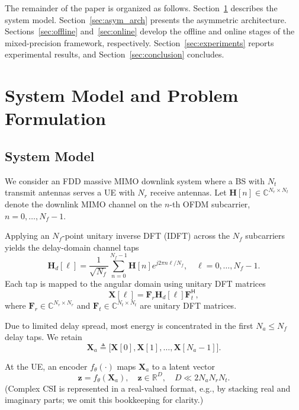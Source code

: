 \documentclass[conference]{IEEEtran}
\begin{document}
\noindent
The remainder of the paper is organized as follows. Section~\ref{sec:system_model} describes the system model. Section~\ref{sec:asym_arch} presents the asymmetric architecture. Sections~\ref{sec:offline} and~\ref{sec:online} develop the offline and online stages of the mixed-precision framework, respectively. Section~\ref{sec:experiments} reports experimental results, and Section~\ref{sec:conclusion} concludes.

\section{System Model and Problem Formulation}
\label{sec:system_model}

\subsection{System Model}
\label{subsec:system_model}
We consider an FDD massive MIMO downlink system where a BS with $N_t$ transmit antennas serves a UE with $N_r$ receive antennas. Let $\mathbf{H}[n] \in \mathbb{C}^{N_r \times N_t}$ denote the downlink MIMO channel on the $n$-th OFDM subcarrier, $n=0,\ldots,N_f-1$.

Applying an $N_f$-point unitary inverse DFT (IDFT) across the $N_f$ subcarriers yields the delay-domain channel taps
\begin{equation}
\mathbf{H}_d[\ell]
= \frac{1}{\sqrt{N_f}} \sum_{n=0}^{N_f-1} \mathbf{H}[n] e^{j 2\pi n\ell/N_f},
\quad \ell=0,\ldots,N_f-1.
\label{eq:delay_idft}
\end{equation}
Each tap is mapped to the angular domain using unitary DFT matrices
\begin{equation}
\mathbf{X}[\ell] = \mathbf{F}_r \mathbf{H}_d[\ell] \mathbf{F}_t^{\mathsf{H}},
\label{eq:ang_transform}
\end{equation}
where $\mathbf{F}_r \in \mathbb{C}^{N_r \times N_r}$ and $\mathbf{F}_t \in \mathbb{C}^{N_t \times N_t}$ are unitary DFT matrices.

Due to limited delay spread, most energy is concentrated in the first $N_a \le N_f$ delay taps. We retain
\begin{equation}
\mathbf{X}_a \triangleq \big[ \mathbf{X}[0], \mathbf{X}[1], \ldots, \mathbf{X}[N_a-1] \big].
\label{eq:truncate}
\end{equation}

At the UE, an encoder $f_\theta(\cdot)$ maps $\mathbf{X}_a$ to a latent vector
\begin{equation}
\mathbf{z} = f_\theta(\mathbf{X}_a), \quad \mathbf{z}\in\mathbb{R}^{D}, \quad D \ll 2 N_a N_r N_t.
\label{eq:encoder}
\end{equation}
(Complex CSI is represented in a real-valued format, e.g., by stacking real and imaginary parts; we omit this bookkeeping for clarity.)
\end{document}
